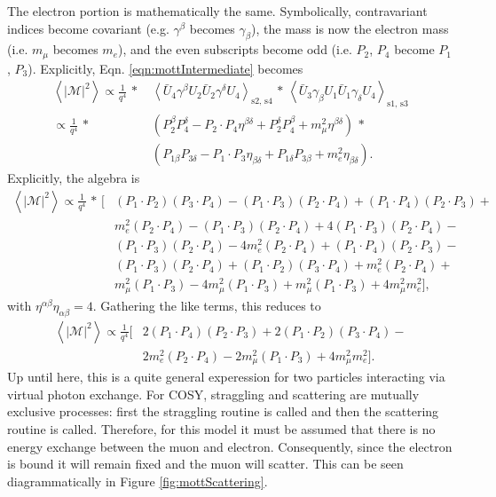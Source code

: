 The electron portion is mathematically the same. Symbolically, contravariant indices become covariant (e.g. $\gamma^\beta$ becomes $\gamma_\beta$), the mass is now the electron mass (i.e. $m_\mu$ becomes $m_e$), and the even subscripts become odd (i.e. $P_2$, $P_4$ become $P_1$, $P_3$). Explicitly, Eqn. \ref{eqn:mottIntermediate} becomes
\begin{align*}
\left< |\mathcal{M}|^2\right>
\propto\frac{1}{q^4} \, * \, &\left< \bar{U}_4 \gamma^\beta U_2 \bar{U}_2 \gamma^\delta U_4 \right> _\text{s2, s4} \, * \, \left< \bar{U}_3 \gamma_\beta U_1 \bar{U}_1 \gamma_\delta U_4 \right> _\text{s1, s3}\\
\propto \frac{1}{q^4} \, * \, &(P_2^\beta P_4^\delta - P_2 \cdot P_4 \eta^{\beta\delta}+P_2 ^\delta P_4 ^\beta + m_\mu ^2 \eta^{\beta\delta}) \, * \\
&(P_{1\beta} P_{3\delta} - P_1 \cdot P_3 \eta_{\beta\delta}+P_{1\delta} P_{3\beta} + m_e ^2 \eta_{\beta\delta}).
\end{align*}
Explicitly, the algebra is
\begin{align*}
\left< |\mathcal{M}|^2\right> \propto
\frac{1}{q^4} \, * \, [ &(P_1 \cdot P_2)(P_3 \cdot P_4)-(P_1\cdot P_3)(P_2 \cdot P_4) + (P_1 \cdot P_4)(P_2\cdot P_3)+\\
&m_e ^2 (P_2 \cdot P_4)-(P_1\cdot P_3)(P_2\cdot P_4)+4(P_1\cdot P_3)(P_2\cdot P_4)-\\
&(P_1\cdot P_3)(P_2\cdot P_4) - 4m_e ^2 (P_2 \cdot P_4)+(P_1\cdot P_4)(P_2 \cdot P_3)-\\
&(P_1 \cdot P_3)(P_2 \cdot P_4) + (P_1 \cdot P_2) (P_3 \cdot P_4) + m_e ^2 (P_2 \cdot P_4)+\\
&m_\mu ^2 (P_1 \cdot P_3)-4m_\mu ^2 (P_1\cdot P_3) + m_\mu ^2 (P_1 \cdot P_3) + 4m_\mu ^2 m_e ^2],
\end{align*}
with $\eta^{\alpha\beta} \eta_{\alpha\beta} = 4$. Gathering the like terms, this reduces to
\begin{align*}
\left< |\mathcal{M}|^2\right> \propto \frac{1}{q^4} [&2(P_1 \cdot P_4)(P_2\cdot P_3)+2(P_1\cdot P_2)(P_3 \cdot P_4) - \\
&2 m_e ^2 (P_2 \cdot P_4)-2m_\mu ^2 (P_1 \cdot P_3) + 4 m_\mu ^2 m_e ^2 ].
\end{align*}
Up until here, this is a quite general experession for two particles interacting via virtual photon exchange. For COSY, straggling and scattering are mutually exclusive processes: first the straggling routine is called and then the scattering routine is called. Therefore, for this model it must be assumed that there is no energy exchange between the muon and electron. Consequently, since the electron is bound it will remain fixed and the muon will scatter. This can be seen diagrammatically in Figure \ref{fig:mottScattering}.

